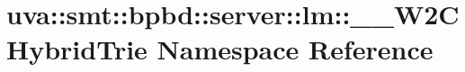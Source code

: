 \hypertarget{namespaceuva_1_1smt_1_1bpbd_1_1server_1_1lm_1_1_____w2_c_hybrid_trie}{}\section{uva\+:\+:smt\+:\+:bpbd\+:\+:server\+:\+:lm\+:\+:\+\_\+\+\_\+\+W2\+C\+Hybrid\+Trie Namespace Reference}
\label{namespaceuva_1_1smt_1_1bpbd_1_1server_1_1lm_1_1_____w2_c_hybrid_trie}
